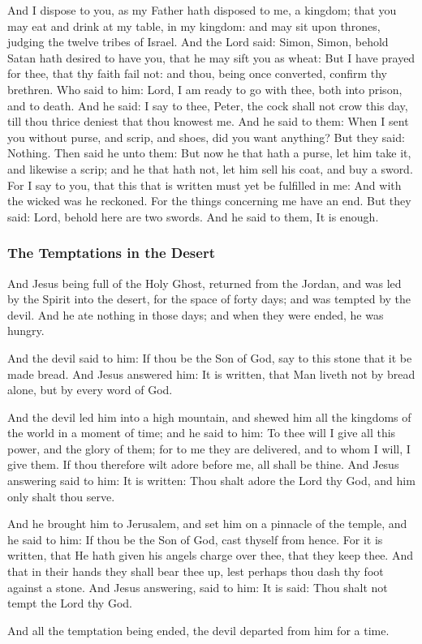 \begin{multicols}{2}
And I dispose to you, as my Father hath disposed to me, a kingdom; that you may eat and drink at my table, in my
kingdom: and may sit upon thrones, judging the twelve tribes of Israel. And the Lord said: Simon, Simon, behold Satan
hath desired to have you, that he may sift you as wheat: But I have prayed for thee, that thy faith fail not: and thou,
being once converted, confirm thy brethren. Who said to him: Lord, I am ready to go with thee, both into prison, and to
death. And he said: I say to thee, Peter, the cock shall not crow this day, till thou thrice deniest that thou knowest
me. And he said to them: When I sent you without purse, and scrip, and shoes, did you want anything? But they said:
Nothing. Then said he unto them: But now he that hath a purse, let him take it, and likewise a scrip; and he that hath
not, let him sell his coat, and buy a sword. For I say to you, that this that is written must yet be fulfilled in me:
And with the wicked was he reckoned. For the things concerning me have an end. But they said: Lord, behold here are two
swords. And he said to them, It is enough. 
\end{multicols}

\subsubsection*{The Temptations in the Desert}
\begin{multicols}{2}\small
And Jesus being full of the Holy Ghost, returned from the Jordan, and was led by the Spirit into the desert, for the
space of forty days; and was tempted by the devil. And he ate nothing in those days; and when they were ended, he was
hungry.

And the devil said to him: If thou be the Son of God, say to this stone that it be made bread. And Jesus answered him:
It is written, that Man liveth not by bread alone, but by every word of God.

And the devil led him into a high mountain, and shewed him all the kingdoms of the world in a moment of time; and he
said to him: To thee will I give all this power, and the glory of them; for to me they are delivered, and to whom I
will, I give them. If thou therefore wilt adore before me, all shall be thine. And Jesus answering said to him: It is
written: Thou shalt adore the Lord thy God, and him only shalt thou serve.

And he brought him to Jerusalem, and set him on a pinnacle of the temple, and he said to him: If thou be the Son of God,
cast thyself from hence. For it is written, that He hath given his angels charge over thee, that they keep thee. And
that in their hands they shall bear thee up, lest perhaps thou dash thy foot against a stone. And Jesus answering, said
to him: It is said: Thou shalt not tempt the Lord thy God.

And all the temptation being ended, the devil departed from him for a time.

\end{multicols}

